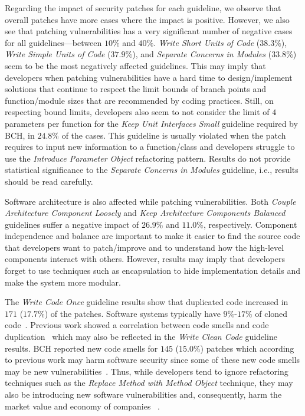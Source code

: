 \documentclass[smallextended]{svjour3}       %
\begin{document}
Regarding the impact of security patches for each guideline, we observe
that overall patches have more cases where the impact is positive. However, 
we also see that patching vulnerabilities has a very
significant number of negative cases for all guidelines---between $10\%$ and $40\%$. 
\emph{Write Short Units of Code} ($38.3\%$), \emph{Write Simple Units of Code} 
($37.9\%$), and \emph{Separate Concerns in Modules} ($33.8\%$) seem to be the 
most negatively affected guidelines. This may imply that developers when patching 
vulnerabilities have a hard time to design/implement solutions that continue to 
respect the limit bounds of branch points and function/module sizes that are 
recommended by coding practices. Still, on 
respecting bound limits, developers also seem to not consider the limit 
of $4$ parameters per function for the \emph{Keep Unit Interfaces Small} 
guideline required by BCH, in $24.8\%$ of the cases. This guideline is usually
violated when the patch requires to input new information to a function/class 
and developers struggle to use the \emph{Introduce Parameter Object} refactoring 
pattern. Results do not provide statistical significance to the \emph{Separate 
Concerns in Modules} guideline, i.e., results should be read carefully. 


Software architecture is also affected while patching vulnerabilities.
Both \emph{Couple Architecture Component Loosely} and \emph{Keep
Architecture Components Balanced} guidelines suffer a negative impact of 
$26.9\%$ and $11.0\%$, respectively. Component independence and balance
are important to make it easier to find the source code that developers
want to patch/improve and to understand how the high-level components
interact with others. However, results may imply that developers
forget to use techniques such as encapsulation to hide implementation
details and make the system more modular.

The \emph{Write Code Once} guideline results show that duplicated code 
increased in $171$ ($17.7\%$) of the patches. Software systems typically have 
$9\%$-$17\%$ of cloned code~\cite{5773403}. Previous work showed a 
correlation between code smells and code duplication~\cite{7476787} 
which may also be reflected in the \emph{Write Clean Code} guideline results. 
BCH reported new code smells for $145$ ($15.0\%$) patches which according 
to previous work may harm software security since some of these new code
smells may be new vulnerabilities~\cite{8819456}.
Thus, while developers 
tend to ignore refactoring techniques such as the \emph{Replace Method 
with Method Object} technique, they may also be introducing new software 
vulnerabilities and, consequently, harm the market value and economy of companies
~\cite{4267025}.
\end{document}

